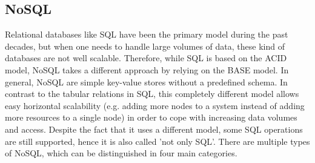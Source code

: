 \documentclass[a4paper,12pt]{report}
\begin{document}
\subsection{NoSQL}\label{subsec:NoSQL}

Relational databases like SQL have been the primary model during the past decades, but when one needs to handle large volumes of data, these kind of databases are not well scalable. Therefore, while SQL is based on the ACID model, NoSQL takes a different approach by relying on the BASE model. In general, NoSQL are simple key-value stores without a predefined schema. In contrast to the tabular relations in SQL, this completely different model allows easy horizontal scalability (e.g. adding more nodes to a system instead of adding more resources to a single node) in order to cope with increasing data volumes and access. Despite the fact that it uses a different model, some SQL operations are still supported, hence it is also called 'not only SQL'. There are multiple types of NoSQL, which can be distinguished in four main categories. 
\end{document}

